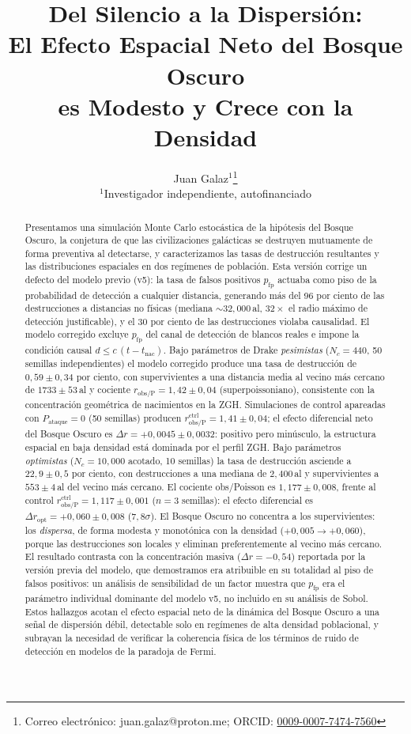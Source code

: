 \documentclass[useAMS,usenatbib,onecolumn]{mn2e}
\title[Bosque Oscuro Monte Carlo]{
  Del Silencio a la Dispersión:\\
  El Efecto Espacial Neto del Bosque Oscuro\\
  es Modesto y Crece con la Densidad
}
\author[Juan Galaz]{
  Juan Galaz$^{1}$\thanks{Correo electrónico: juan.galaz@proton.me;
  ORCID: \href{https://orcid.org/0009-0007-7474-7560}{0009-0007-7474-7560}}
  \\
  $^{1}$Investigador independiente, autofinanciado
}
\begin{document}
\maketitle

\begin{abstract}
Presentamos una simulación Monte Carlo estocástica de la hipótesis del
Bosque Oscuro, la conjetura de que las civilizaciones galácticas se
destruyen mutuamente de forma preventiva al detectarse, y
caracterizamos las tasas de destrucción resultantes y las distribuciones
espaciales en dos regímenes de población.
Esta versión corrige un defecto del modelo previo (v5): la tasa de
falsos positivos $p_\text{fp}$ actuaba como piso de la probabilidad de
detección a cualquier distancia, generando más del 96 por ciento de las
destrucciones a distancias no físicas (mediana $\sim 32{,}000$\,al,
$32\times$ el radio máximo de detección justificable), y el 30 por
ciento de las destrucciones violaba causalidad.
El modelo corregido excluye $p_\text{fp}$ del canal de detección de
blancos reales e impone la condición causal
$d \leq c\,(t - t_\text{nac})$.
Bajo parámetros de Drake \emph{pesimistas} ($N_c = 440$, 50 semillas
independientes) el modelo corregido produce una tasa de destrucción de
$0{,}59 \pm 0{,}34$ por ciento, con supervivientes a una distancia media
al vecino más cercano de $1733 \pm 53$\,al y cociente
$r_\text{obs/P} = 1{,}42 \pm 0{,}04$ (superpoissoniano), consistente
con la concentración geométrica de nacimientos en la ZGH.
Simulaciones de control apareadas con $P_\text{ataque} = 0$ (50
semillas) producen $r_\text{obs/P}^\text{ctrl} = 1{,}41 \pm 0{,}04$;
el efecto diferencial neto del Bosque Oscuro es
$\Delta r = +0{,}0045 \pm 0{,}0032$: positivo pero minúsculo, la
estructura espacial en baja densidad está dominada por el perfil ZGH.
Bajo parámetros \emph{optimistas} ($N_c = 10{,}000$ acotado, 10
semillas) la tasa de destrucción asciende a $22{,}9 \pm 0{,}5$ por
ciento, con destrucciones a una mediana de $2{,}400$\,al y
supervivientes a $553 \pm 4$\,al del vecino más cercano.
El cociente obs/Poisson es $1{,}177 \pm 0{,}008$, frente al control
$r_\text{obs/P}^\text{ctrl} = 1{,}117 \pm 0{,}001$ ($n = 3$ semillas):
el efecto diferencial es $\Delta r_\text{opt} = +0{,}060 \pm 0{,}008$
($7{,}8\sigma$).
El Bosque Oscuro no concentra a los supervivientes: los \emph{dispersa},
de forma modesta y monotónica con la densidad
($+0{,}005 \to +0{,}060$), porque las destrucciones son locales
y eliminan preferentemente al vecino más cercano.
El resultado contrasta con la concentración masiva
($\Delta r = -0{,}54$) reportada por la versión previa del modelo, que
demostramos era atribuible en su totalidad al piso de falsos positivos:
un análisis de sensibilidad de un factor muestra que $p_\text{fp}$
era el parámetro individual dominante del modelo v5, no incluido en su
análisis de Sobol.
Estos hallazgos acotan el efecto espacial neto de la dinámica del
Bosque Oscuro a una señal de dispersión débil, detectable solo en
regímenes de alta densidad poblacional, y subrayan la necesidad de
verificar la coherencia física de los términos de ruido de detección
en modelos de la paradoja de Fermi.
\end{abstract}
\end{document}

